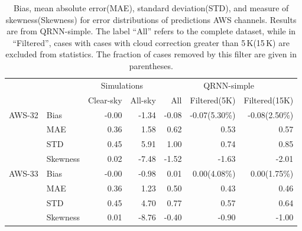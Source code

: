 \documentclass[amt, manuscript]{copernicus}
\begin{document}
\begin{table}[t]
	\caption{Bias, mean absolute error(MAE), standard deviation(STD), and measure of skewness(Skewness) for error distributions of predictions AWS channels. Results are from QRNN-simple. The label ``All'' refers to the complete dataset, while in ``Filtered'', cases with cases with cloud correction greater than 5\,K(15\,K) are excluded from statistics. The fraction of cases removed by this filter are given in parentheses.}
	\label{tab:statistics_aws}
	\begin{tabular}{llrr|rrr}
		\tophline
		&&\multicolumn{2}{c|}{Simulations}& \multicolumn{3}{c}{QRNN-simple} \\
		\cline{3-7}
		&&   Clear-sky &   All-sky &   		 All &   Filtered(5K)& Filtered(15K) \\
		\middlehline
AWS-32    &Bias     &   -0.00 &         -1.34 &           -0.08 &       		-0.07(5.30\%) & -0.08(2.50\%) \\
          &MAE      &    0.36 &          1.58 &            0.62 &        		 0.53 		  &	0.57	\\
          &STD      &    0.45 &          5.91 &            1.00 &        		 0.74 		  & 0.85\\
          &Skewness &    0.02 &         -7.48 &           -1.52 &       		-1.63 		  & -2.01\\
		\middlehline
AWS-33	  &Bias     &   -0.00 &         -0.98 &            0.01 &                 0.00(4.08\%)& 0.00(1.75\%)\\
		  &MAE      &    0.36 &          1.23 &            0.50 &                 0.43 	      & 0.46\\
		  &STD      &    0.45 &          4.70 &            0.77 &                 0.57 	      & 0.64\\
		  &Skewness &    0.01 &         -8.76 &           -0.40 &                -0.90  	  & -1.00\\


\end{tabular}
\end{table}
\end{document}
